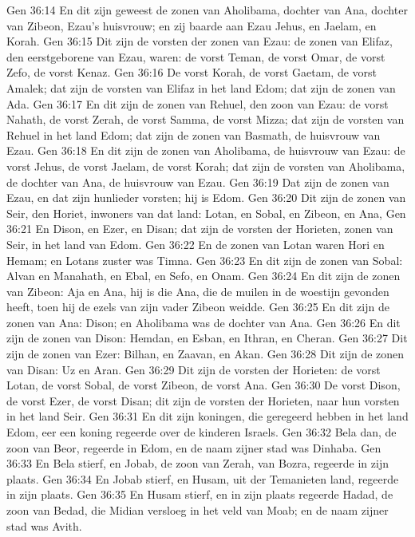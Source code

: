 Gen 36:14  En dit zijn geweest de zonen van Aholibama, dochter van Ana, dochter van Zibeon, Ezau's huisvrouw; en zij baarde aan Ezau Jehus, en Jaelam, en Korah.
Gen 36:15  Dit zijn de vorsten der zonen van Ezau: de zonen van Elifaz, den eerstgeborene van Ezau, waren: de vorst Teman, de vorst Omar, de vorst Zefo, de vorst Kenaz.
Gen 36:16  De vorst Korah, de vorst Gaetam, de vorst Amalek; dat zijn de vorsten van Elifaz in het land Edom; dat zijn de zonen van Ada.
Gen 36:17  En dit zijn de zonen van Rehuel, den zoon van Ezau: de vorst Nahath, de vorst Zerah, de vorst Samma, de vorst Mizza; dat zijn de vorsten van Rehuel in het land Edom; dat zijn de zonen van Basmath, de huisvrouw van Ezau.
Gen 36:18  En dit zijn de zonen van Aholibama, de huisvrouw van Ezau: de vorst Jehus, de vorst Jaelam, de vorst Korah; dat zijn de vorsten van Aholibama, de dochter van Ana, de huisvrouw van Ezau.
Gen 36:19  Dat zijn de zonen van Ezau, en dat zijn hunlieder vorsten; hij is Edom.
Gen 36:20  Dit zijn de zonen van Seir, den Horiet, inwoners van dat land: Lotan, en Sobal, en Zibeon, en Ana,
Gen 36:21  En Dison, en Ezer, en Disan; dat zijn de vorsten der Horieten, zonen van Seir, in het land van Edom.
Gen 36:22  En de zonen van Lotan waren Hori en Hemam; en Lotans zuster was Timna.
Gen 36:23  En dit zijn de zonen van Sobal: Alvan en Manahath, en Ebal, en Sefo, en Onam.
Gen 36:24  En dit zijn de zonen van Zibeon: Aja en Ana, hij is die Ana, die de muilen in de woestijn gevonden heeft, toen hij de ezels van zijn vader Zibeon weidde.
Gen 36:25  En dit zijn de zonen van Ana: Dison; en Aholibama was de dochter van Ana.
Gen 36:26  En dit zijn de zonen van Dison: Hemdan, en Esban, en Ithran, en Cheran.
Gen 36:27  Dit zijn de zonen van Ezer: Bilhan, en Zaavan, en Akan.
Gen 36:28  Dit zijn de zonen van Disan: Uz en Aran.
Gen 36:29  Dit zijn de vorsten der Horieten: de vorst Lotan, de vorst Sobal, de vorst Zibeon, de vorst Ana.
Gen 36:30  De vorst Dison, de vorst Ezer, de vorst Disan; dit zijn de vorsten der Horieten, naar hun vorsten in het land Seir.
Gen 36:31  En dit zijn koningen, die geregeerd hebben in het land Edom, eer een koning regeerde over de kinderen Israels.
Gen 36:32  Bela dan, de zoon van Beor, regeerde in Edom, en de naam zijner stad was Dinhaba.
Gen 36:33  En Bela stierf, en Jobab, de zoon van Zerah, van Bozra, regeerde in zijn plaats.
Gen 36:34  En Jobab stierf, en Husam, uit der Temanieten land, regeerde in zijn plaats.
Gen 36:35  En Husam stierf, en in zijn plaats regeerde Hadad, de zoon van Bedad, die Midian versloeg in het veld van Moab; en de naam zijner stad was Avith.
